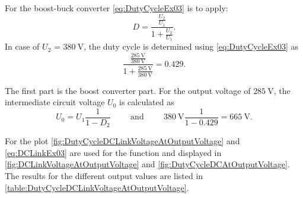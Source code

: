 
\begin{solutionblock}
    For the boost-buck converter \eqref{eq:DutyCycleEx03} is to apply:
    \begin{equation}
        D = \frac{\frac{U_\mathrm{2}}{U_\mathrm{1}}} {1+{\frac{U_\mathrm{2}}{U_\mathrm{1}}}}.
        \label{eq:DutyCycleEx03}
    \end{equation}
    In case of $U_\mathrm{2}$ = $\SI{380}{\volt}$, the duty cycle is determined using \eqref{eq:DutyCycleEx03} as
    \begin{equation}
       \frac{\frac{\SI{285}{\volt}}{\SI{380}{\volt}}} {1+{\frac{\SI{285}{\volt}}{\SI{380}{\volt}}}} = 0.429.
    \end{equation}
\end{solutionblock}



\begin{solutionblock}
    The first part is the boost converter part. For the output voltage 
    of $\SI{285}{\volt}$, the intermediate circuit voltage $U_\mathrm{0}$ is calculated as
    \begin{equation}
        U_\mathrm{0}=U_\mathrm{1} \frac{1}{1-D_\mathrm{2}} 
        \hspace{1cm} \mathrm{and} \hspace{1cm}  
        \SI{380}{\volt} \frac{1}{1-0.429} = \SI{665}{\volt}.
        \label{eq:DCLinkEx03}        
    \end{equation}
\end{solutionblock}



\begin{solutionblock}
    For the plot \eqref{fig:DutyCycleDCLinkVoltageAtOutputVoltage} and \eqref{eq:DCLinkEx03} are used for the function and 
    displayed in \autoref{fig:DCLinkVoltageAtOutputVoltage} and \autoref{fig:DutyCycleDCAtOutputVoltage}. The results for the different output values are listed in \autoref{table:DutyCycleDCLinkVoltageAtOutputVoltage}.

    
    


    
\end{solutionblock}

